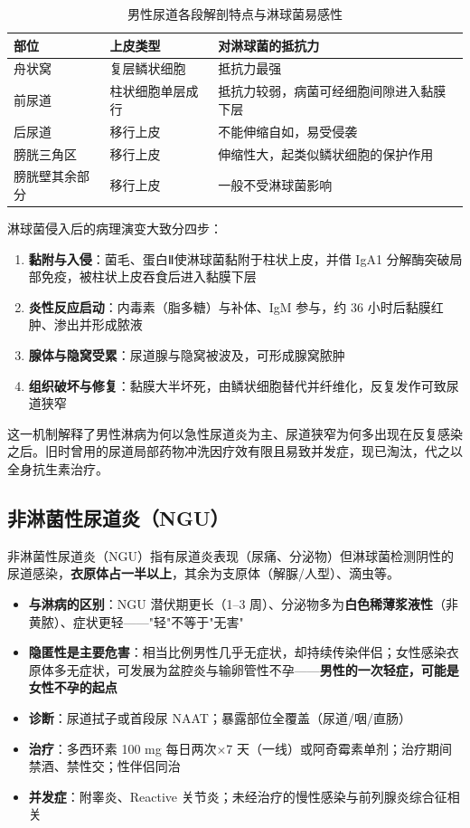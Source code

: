 \documentclass[12pt,a4paper,twoside]{ctexbook}
\begin{document}
\begin{table}[htbp]
	\centering
	\caption{男性尿道各段解剖特点与淋球菌易感性}
	\label{tab:male_urethra_anatomy}
	\begin{tabularx}{\textwidth}{@{}l l X@{}}
		\toprule
		部位 & 上皮类型 & 对淋球菌的抵抗力 \\
		\midrule
		舟状窝 & 复层鳞状细胞 & 抵抗力最强 \\
		前尿道 & 柱状细胞单层成行 & 抵抗力较弱，病菌可经细胞间隙进入黏膜下层 \\
		后尿道 & 移行上皮 & 不能伸缩自如，易受侵袭 \\
		膀胱三角区 & 移行上皮 & 伸缩性大，起类似鳞状细胞的保护作用 \\
		膀胱壁其余部分 & 移行上皮 & 一般不受淋球菌影响 \\
		\bottomrule
	\end{tabularx}
\end{table}

淋球菌侵入后的病理演变大致分四步：

\begin{enumerate}
	\item \textbf{黏附与入侵}：菌毛、蛋白Ⅱ使淋球菌黏附于柱状上皮，并借 IgA1 分解酶突破局部免疫，被柱状上皮吞食后进入黏膜下层
	\item \textbf{炎性反应启动}：内毒素（脂多糖）与补体、IgM 参与，约 36 小时后黏膜红肿、渗出并形成脓液
	\item \textbf{腺体与隐窝受累}：尿道腺与隐窝被波及，可形成腺窝脓肿
	\item \textbf{组织破坏与修复}：黏膜大半坏死，由鳞状细胞替代并纤维化，反复发作可致尿道狭窄
\end{enumerate}

这一机制解释了男性淋病为何以急性尿道炎为主、尿道狭窄为何多出现在反复感染之后。旧时曾用的尿道局部药物冲洗因疗效有限且易致并发症，现已淘汰，代之以全身抗生素治疗。

\subsection{非淋菌性尿道炎（NGU）}


非淋菌性尿道炎（NGU）指有尿道炎表现（尿痛、分泌物）但淋球菌检测阴性的尿道感染，\textbf{衣原体占一半以上}，其余为支原体（解脲/人型）、滴虫等。

\begin{itemize}
	\item \textbf{与淋病的区别}：NGU 潜伏期更长（1--3 周）、分泌物多为\textbf{白色稀薄浆液性}（非黄脓）、症状更轻——"轻"不等于"无害"
	\item \textbf{隐匿性是主要危害}：相当比例男性几乎无症状，却持续传染伴侣；女性感染衣原体多无症状，可发展为盆腔炎与输卵管性不孕——\textbf{男性的一次轻症，可能是女性不孕的起点}
	\item \textbf{诊断}：尿道拭子或首段尿 NAAT；暴露部位全覆盖（尿道/咽/直肠）
	\item \textbf{治疗}：多西环素 100 mg 每日两次×7 天（一线）或阿奇霉素单剂；治疗期间禁酒、禁性交；性伴侣同治
	\item \textbf{并发症}：附睾炎、Reactive 关节炎；未经治疗的慢性感染与前列腺炎综合征相关
\end{itemize}
\end{document}
